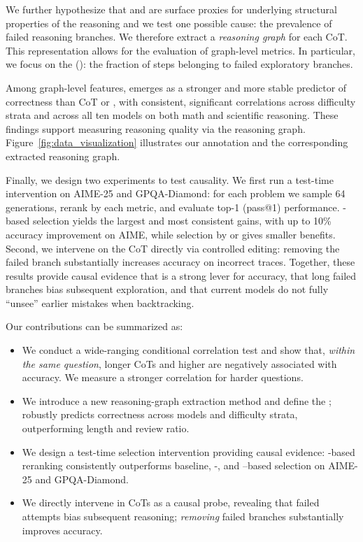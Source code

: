 We further hypothesize that \Length and \rr are surface proxies for underlying structural properties of the reasoning \citep{jiang2025makes} and we test one possible cause: the prevalence of failed reasoning branches. We therefore extract a \emph{reasoning graph} for each CoT. This representation allows for the evaluation of graph-level metrics. In particular, we focus on the \failedstep(\fsf): the fraction of steps belonging to failed exploratory branches.

Among graph-level features, \fsf emerges as a stronger and more stable predictor of correctness than CoT \Length or \rr, with consistent, significant correlations across difficulty strata and across all ten models on both math and scientific reasoning. These findings support measuring reasoning quality via the reasoning graph. Figure~\ref{fig:data_visualization} illustrates our annotation and the corresponding extracted reasoning graph.

Finally, we design two experiments to test causality. We first run a test-time intervention on AIME-25 and GPQA-Diamond: for each problem we sample 64 generations, rerank by each metric, and evaluate top-1 (pass@1) performance. \fsf-based selection yields the largest and most consistent gains, with up to 10\% accuracy improvement on AIME, while selection by \Length or \rr gives smaller benefits. Second, we intervene on the CoT directly via controlled editing: removing the failed branch substantially increases accuracy on incorrect traces. Together, these results provide causal evidence that \fsf is a strong lever for accuracy, that long failed branches bias subsequent exploration, and that current models do not fully “unsee” earlier mistakes when backtracking.


Our contributions can be summarized as:
\begin{itemize}
\item We conduct a wide-ranging conditional correlation test and show that, \emph{within the same question}, longer CoTs and higher \rr are negatively associated with accuracy. We measure a stronger correlation for harder questions.
\item We introduce a new reasoning-graph extraction method and define the \failedstep; \fsf robustly predicts correctness across models and difficulty strata, outperforming length and review ratio.
\item We design a test-time selection intervention providing causal evidence: \fsf-based reranking consistently outperforms baseline, \Length-, and \rr–based selection on AIME-25 and GPQA-Diamond.
\item We directly intervene in CoTs as a causal probe, revealing that failed attempts bias subsequent reasoning; \emph{removing} failed branches substantially improves accuracy.
\end{itemize}


